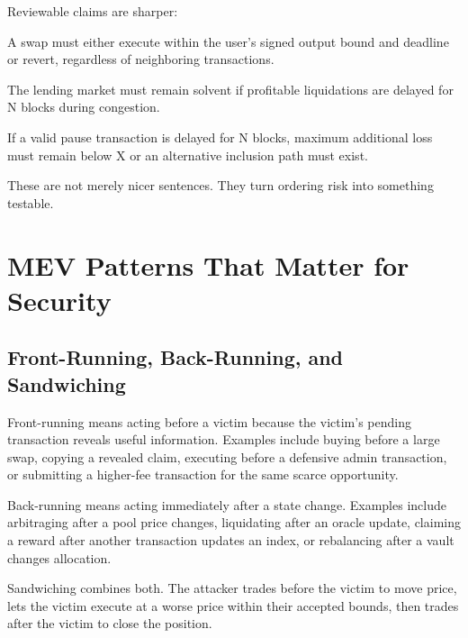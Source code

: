 Reviewable claims are sharper:

\begin{codeblock}
A swap must either execute within the user's signed output bound and
deadline or revert, regardless of neighboring transactions.

The lending market must remain solvent if profitable liquidations are
delayed for N blocks during congestion.

If a valid pause transaction is delayed for N blocks, maximum additional
loss must remain below X or an alternative inclusion path must exist.
\end{codeblock}

These are not merely nicer sentences. They turn ordering risk into something testable.

\section{MEV Patterns That Matter for Security}

\subsection{Front-Running, Back-Running, and Sandwiching}

Front-running means acting before a victim because the victim's pending transaction reveals useful information. Examples include buying before a large swap, copying a revealed claim, executing before a defensive admin transaction, or submitting a higher-fee transaction for the same scarce opportunity.

Back-running means acting immediately after a state change. Examples include arbitraging after a pool price changes, liquidating after an oracle update, claiming a reward after another transaction updates an index, or rebalancing after a vault changes allocation.

Sandwiching combines both. The attacker trades before the victim to move price, lets the victim execute at a worse price within their accepted bounds, then trades after the victim to close the position.


